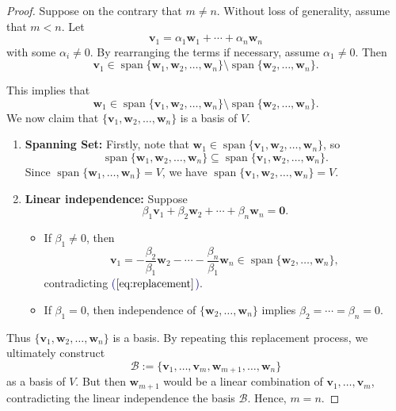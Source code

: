 \begin{proof}
Suppose on the contrary that $m \neq n$. Without loss of generality, assume that $m < n$. Let
\[
\mathbf{v}_1 = \alpha_1 \mathbf{w}_1 + \cdots + \alpha_n \mathbf{w}_n
\]
with some $\alpha_i \neq 0$. By rearranging the terms if necessary, assume $\alpha_1 \neq 0$. Then
\begin{equation}\label{eq:replacement}
\mathbf{v}_1 \in \operatorname{span}\{ \mathbf{w}_1, \mathbf{w}_2, \ldots, \mathbf{w}_n \} \setminus \operatorname{span}\{ \mathbf{w}_2, \ldots, \mathbf{w}_n \}.
\end{equation}

This implies that
\[
\mathbf{w}_1 \in \operatorname{span}\{ \mathbf{v}_1, \mathbf{w}_2, \ldots, \mathbf{w}_n \} \setminus \operatorname{span}\{ \mathbf{w}_2, \ldots, \mathbf{w}_n \}.
\]
We now claim that $\{ \mathbf{v}_1, \mathbf{w}_2, \ldots, \mathbf{w}_n \}$ is a basis of $V$.

\begin{enumerate}
  \item \textbf{Spanning Set:} Firstly, note that
  $\mathbf{w}_1 \in \operatorname{span}\{ \mathbf{v}_1, \mathbf{w}_2, \ldots, \mathbf{w}_n \}$, so 
  \[\operatorname{span}\{ \mathbf{w}_1, \mathbf{w}_2, \ldots, \mathbf{w}_n \} \subseteq \operatorname{span}\{ \mathbf{v}_1, \mathbf{w}_2, \ldots, \mathbf{w}_n \}.
  \]
  Since $\operatorname{span}\{ \mathbf{w}_1, \ldots, \mathbf{w}_n \} = V$, we have $\operatorname{span}\{ \mathbf{v}_1, \mathbf{w}_2, \ldots, \mathbf{w}_n \} = V$.

  \item \textbf{Linear independence:} Suppose
  \[
  \beta_1 \mathbf{v}_1 + \beta_2 \mathbf{w}_2 + \cdots + \beta_n \mathbf{w}_n = \mathbf{0}.
  \]
  \begin{itemize}
    \item If $\beta_1 \neq 0$, then
    \[
    \mathbf{v}_1 = -\frac{\beta_2}{\beta_1} \mathbf{w}_2 - \cdots - \frac{\beta_n}{\beta_1} \mathbf{w}_n \in \operatorname{span}\{ \mathbf{w}_2, \ldots, \mathbf{w}_n \},
    \]
    contradicting \textcolor{darkblue}{($\ref{eq:replacement}$)}.

    \item If $\beta_1 = 0$, then independence of $\{ \mathbf{w}_2, \ldots, \mathbf{w}_n \}$ implies $\beta_2 = \cdots = \beta_n = 0$.
  \end{itemize}
\end{enumerate}

Thus $\{ \mathbf{v}_1, \mathbf{w}_2, \ldots, \mathbf{w}_n \}$ is a basis. By repeating this replacement process, we ultimately construct
\[\mathcal{B} :=
\{ \mathbf{v}_1, \ldots, \mathbf{v}_m, \mathbf{w}_{m+1}, \ldots, \mathbf{w}_n \}
\]
as a basis of $V$. But then $\mathbf{w}_{m+1}$ would be a linear combination of $\mathbf{v}_1, \ldots, \mathbf{v}_m$, contradicting the linear independence the basis $\mathcal{B}$. Hence, $m = n$.
\end{proof}

